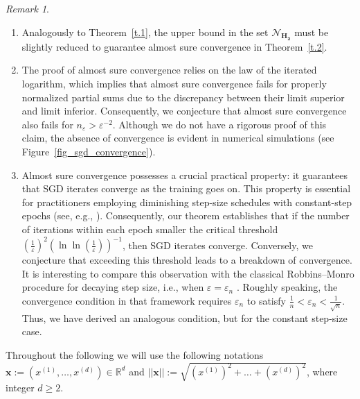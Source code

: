 \documentclass{article}
\theoremstyle{plain}
\theoremstyle{definition}
\theoremstyle{remark}
\newtheorem{remark}[theorem]{Remark}
\begin{document}
\begin{remark}\label{H2rem1}
\begin{enumerate}
    \item Analogously to Theorem~\ref{t.1}, the upper bound in the set $\mathcal{N}_{\mathbf{H_2}}$ must be slightly reduced to guarantee almost sure convergence in Theorem~\ref{t.2}.
    \item The proof of almost sure convergence relies on the law of the iterated logarithm, which implies that almost sure convergence fails for properly normalized partial sums due to the discrepancy between their limit superior and limit inferior. Consequently, we conjecture that almost sure convergence also fails for $n_{\varepsilon} > \varepsilon^{-2}$. Although we do not have a rigorous proof of this claim, the absence of convergence is evident in numerical simulations (see Figure~\ref{fig_sgd_convergence}).
    \item Almost sure convergence possesses a crucial practical property: it guarantees that SGD iterates converge as the training goes on. This property is essential for practitioners employing diminishing step-size schedules with constant-step epochs (see, e.g., \cite{you2019does}). Consequently, our theorem establishes that if the number of iterations within each epoch smaller the critical threshold $\left(\frac{1}{\varepsilon}\right)^2\left(\ln \ln \left(\frac{1}{\varepsilon}\right)\right)^{-1}$, then SGD iterates converge. Conversely, we conjecture that exceeding this threshold leads to a breakdown of convergence.    It is interesting to compare this observation with the classical Robbins--Monro procedure for decaying step size, i.e., when $\varepsilon = \varepsilon_n$ \citep{RobbinsMonro1951}. Roughly speaking, the convergence condition in that framework requires $\varepsilon_n$ to satisfy $\frac{1}{n} < \varepsilon_n < \frac{1}{\sqrt{n}}$. Thus, we have derived an analogous condition, but for the constant step-size case.
    \end{enumerate}
\end{remark}

Throughout the following we will use the following notations
$\boldsymbol{x}:=(x^{(1)},\dots,x^{(d)})\in\mathbb{R}^d$
 and 
$||\boldsymbol{x}||:=\sqrt{(x^{(1)})^2
+\dots+(x^{(d)})^2}$, where integer $d\geqslant 2$.
\end{document}
